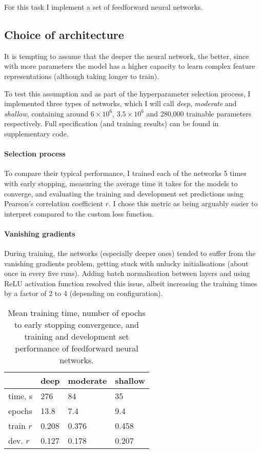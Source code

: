 \documentclass[10pt, twocolumn]{article}
\begin{document}
For this task I implement a set of feedforward neural networks.

\subsection{Choice of architecture}
It is tempting to assume that the deeper the neural network, the better, since with more parameters the model has a higher capacity to learn complex feature representations (although taking longer to train). 

To test this assumption and as part of the hyperparameter selection process, I implemented three types of networks, which I will call \textit{deep}, \textit{moderate} and \textit{shallow}, containing around $6\times 10^6$, $3.5\times 10^6$ and 280,000 trainable parameters respectively. Full specification (and training results) can be found in supplementary code. 

\paragraph{Selection process} To compare their typical performance, I trained each of the networks 5 times with early stopping, measuring the average time it takes for the models to converge, and evaluating the training and development set predictions using Pearson's correlation coefficient $r$. I chose this metric as being arguably easier to interpret compared to the custom loss function.

\paragraph{Vanishing gradients} During training, the networks (especially deeper ones) tended to suffer from the vanishing gradients problem, getting stuck with unlucky initialisations (about once in every five runs). Adding batch normalisation between layers and using ReLU activation function resolved this issue, albeit increasing the training times by a factor of 2 to 4 (depending on configuration). 

\begin{table}[]
	\begin{tabularx}{\linewidth}{XXXX}
		\hline
				& \textbf{deep} & \textbf{moderate} & \textbf{shallow}\\ \hline
		time, s     & 276   & 84  & 35 \\
		epochs & 13.8 & 7.4 & 9.4 \\
		train $r$ & 0.208 & 0.376 & 0.458 \\
		dev. $r$ & 0.127 & 0.178 & 0.207
		\end{tabularx}
\caption{Mean training time, number of epochs to early stopping convergence, and training and development set performance of feedforward neural networks.}\label{g1}
\end{table}
\end{document}
